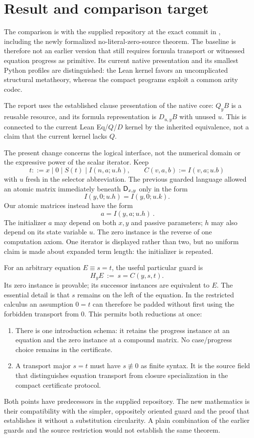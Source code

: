 \section{Result and comparison target}
\label{sec:overview}

The comparison is with the supplied repository at the exact commit in
\cite{snapshot}, including the newly formalized no-literal-zero-source
theorem.  The baseline is therefore not an earlier version that still
requires formula transport or witnessed equation progress as primitive.
Its current native presentation and its smallest Python profiles are
distinguished: the Lean kernel favors an uncomplicated structural
metatheory, whereas the compact programs exploit a common arity codec.

The report uses the established clause presentation of the native core:
$Q_yB$ is a reusable resource, and its formula representation is
$D_{u,y}B$ with unused $u$.  This is connected to the current Lean
Eq/$Q$/$D$ kernel by the inherited equivalence, not a claim that the
current kernel lacks $Q$.

The present change concerns the logical interface, not the numerical
domain or the expressive power of the scalar iterator.  Keep
\[
 t ::= x\mid 0\mid S(t)\mid I(n,a;u.h),
 \qquad C(v,a,b):=I(v,a;u.b)
\]
with $u$ fresh in the selector abbreviation.  The previous guarded
language allowed an atomic matrix immediately beneath $\mathsf D_{x,y}$ only
in the form
\[
                 I(y,0;u.h)=I(y,0;u.k).
\]
Our atomic matrices instead have the form
\[
                 \boxed{\ a=I(y,a;u.h)\ }.
\tag{M}\label{eq:overview-mirror}
\]
The initializer $a$ may depend on both $x,y$ and passive parameters;
$h$ may also depend on its state variable $u$.  The zero instance is
the reverse of one computation axiom.  One iterator is displayed rather
than two, but no uniform claim is made about expanded term length:
the initializer is repeated.

For an arbitrary equation $E\equiv s=t$, the useful particular guard is
\[
                H_y E\ :=\ s=C(y,s,t).
\]
Its zero instance is provable; its successor instances are equivalent
to $E$.  The essential detail is that $s$ remains on the left of the
equation.  In the restricted calculus an assumption $0=t$ can therefore
be padded without first using the forbidden transport from $0$.
This permits both reductions at once:
\begin{enumerate}
\item There is one introduction schema: it retains the progress
instance at an equation and the zero instance at a compound matrix.
No case/progress choice remains in the certificate.
\item A transport major $s=t$ must have $s\not\equiv0$ as finite syntax.
It is the source field that distinguishes equation transport from
closure specialization in the compact certificate protocol.
\end{enumerate}
Both points have predecessors in the supplied repository.  The new
mathematics is their compatibility with the simpler, oppositely oriented
guard and the proof that establishes it without a substitution
circularity.  A plain combination of the earlier guards and the source
restriction would not establish the same theorem.


